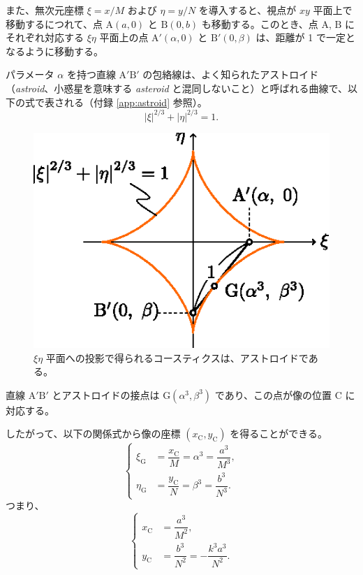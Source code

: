 \documentclass[twocolumn]{article}
\begin{document}
また、無次元座標 $\xi=x/M$ および $\eta=y/N$ を導入すると、視点が $xy$ 平面上で移動するにつれて、点 $\mathrm{A}(a, 0)$ と $\mathrm{B}(0, b)$ も移動する。このとき、点 $\mathrm{A}$, $\mathrm{B}$ にそれぞれ対応する $\xi\eta$ 平面上の点 $\mathrm{A'}(\alpha, 0)$ と $\mathrm{B'}(0, \beta)$ は、距離が 1 で一定となるように移動する。

パラメータ $\alpha$ を持つ直線 ${\mathrm{A'B'}}$ の包絡線は、よく知られたアストロイド（\emph{astroid}、小惑星を意味する \emph{asteroid} と混同しないこと）と呼ばれる曲線で、以下の式で表される（付録 \ref{app:astroid} 参照）。
$$ \left| \xi \right|^{2/3} + \left| \eta \right|^{2/3} = 1. $$

\begin{figure}
	\centering
	\includegraphics{figs/g107.eps}
	\caption{$\xi\eta$ 平面への投影で得られるコースティクスは、アストロイドである。}
	\label{fig:astroid}
\end{figure}

直線 ${\mathrm{A'B'}}$ とアストロイドの接点は $\mathrm{G}(\alpha^3, \beta^3)$ であり、この点が像の位置 $\mathrm{C}$ に対応する。
	
したがって、以下の関係式から像の座標 $(x_{\mathrm{C}}^{}, y_{\mathrm{C}}^{})$ を得ることができる。
$$ \left\{ 
\begin{aligned}
	\xi_{\mathrm{G}}^{} &= \dfrac{x_{\mathrm{C}}^{}}{M} = \alpha^3 = \dfrac{a^3}{M^3},\\
	\eta_{\mathrm{G}}^{} &= \dfrac{y_{\mathrm{C}}^{}}{N} = \beta^3 = \dfrac{b^3}{N^3}.
\end{aligned}
\right.$$
つまり、
$$ \left\{ 
\begin{aligned}
	x_{\mathrm{C}}^{} &= \dfrac{a^3}{M^2},\\
	y_{\mathrm{C}}^{} &= \dfrac{b^3}{N^2}=-\dfrac{k^3a^3}{N^2}.
\end{aligned}
\right.$$
\end{document}
